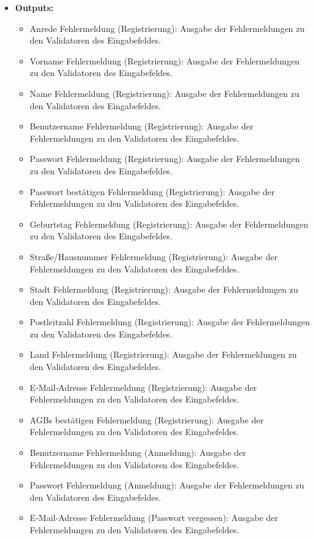 \begin{itemize}
\begin{itemize}
				
			\end{itemize}
			\item \textbf{Outputs:} 
			\begin{itemize}
				\item Anrede Fehlermeldung (Registrierung): Ausgabe der Fehlermeldungen zu den Validatoren des Eingabefeldes.
				\item Vorname Fehlermeldung (Registrierung): Ausgabe der Fehlermeldungen zu den Validatoren des Eingabefeldes.
				\item Name Fehlermeldung (Registrierung): Ausgabe der Fehlermeldungen zu den Validatoren des Eingabefeldes.
				\item Benutzername Fehlermeldung (Registrierung): Ausgabe der Fehlermeldungen zu den Validatoren des Eingabefeldes.
				\item Passwort Fehlermeldung (Registrierung): Ausgabe der Fehlermeldungen zu den Validatoren des Eingabefeldes.
				\item Passwort bestätigen Fehlermeldung (Registrierung): Ausgabe der Fehlermeldungen zu den Validatoren des Eingabefeldes.
				\item Geburtstag Fehlermeldung (Registrierung): Ausgabe der Fehlermeldungen zu den Validatoren des Eingabefeldes.
				\item Straße/Hausnummer Fehlermeldung (Registrierung): Ausgabe der Fehlermeldungen zu den Validatoren des Eingabefeldes.
				\item Stadt Fehlermeldung (Registrierung): Ausgabe der Fehlermeldungen zu den Validatoren des Eingabefeldes.
				\item Postleitzahl Fehlermeldung (Registrierung): Ausgabe der Fehlermeldungen zu den Validatoren des Eingabefeldes.
				\item Land Fehlermeldung (Registrierung): Ausgabe der Fehlermeldungen zu den Validatoren des Eingabefeldes.
				\item E-Mail-Adresse Fehlermeldung (Registrierung): Ausgabe der Fehlermeldungen zu den Validatoren des Eingabefeldes.
				\item AGBs bestätigen Fehlermeldung (Registrierung): Ausgabe der Fehlermeldungen zu den Validatoren des Eingabefeldes.
				\item Benutzername Fehlermeldung (Anmeldung): Ausgabe der Fehlermeldungen zu den Validatoren des Eingabefeldes.
				\item Passwort Fehlermeldung (Anmeldung): Ausgabe der Fehlermeldungen zu den Validatoren des Eingabefeldes.
				\item E-Mail-Adresse Fehlermeldung (Passwort vergessen): Ausgabe der Fehlermeldungen zu den Validatoren des Eingabefeldes.
			\end{itemize}
			

\end{itemize}
